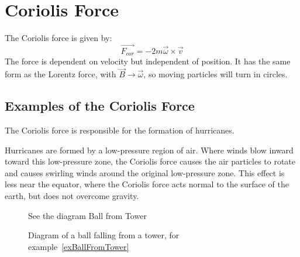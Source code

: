 \documentclass[../Main.tex]{subfiles}
\begin{document}
\section{Coriolis Force}
The Coriolis force is given by:
\begin{equation}
    \vec{F_{cor}} = -2m\vec{\omega} \times \vec{v}
    \label{eqnCoriolis}
\end{equation}
The force is dependent on velocity but independent of position. It has the same form as the Lorentz force, with $\vec{B} \to \vec{\omega}$, so moving particles will turn in circles.
\subsection{Examples of the Coriolis Force}
\begin{example}[Hurricanes]
    The Coriolis force is responsible for the formation of hurricanes.\par
    Hurricanes are formed by a low-pressure region of air. Where winds blow inward toward this low-pressure zone, the Coriolis force causes the air particles to rotate and causes swirling winds around the original low-pressure zone. This effect is less near the equator, where the Coriolis force acts normal to the surface of the earth, but does not overcome gravity.
\end{example}
\begin{figure}[ht]
    \centering
    See the diagram Ball from Tower %
    
    \caption{Diagram of a ball falling from a tower, for example~\ref{exBallFromTower}}
    \label{figBallFromTower}
\end{figure}
\end{document}
